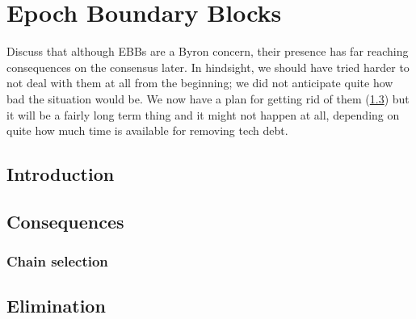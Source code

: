 \chapter{Epoch Boundary Blocks}
\label{ebbs}

Discuss that although EBBs are a Byron concern, their presence has far reaching
consequences on the consensus later. In hindsight, we should have tried harder
to not deal with them at all from the beginning; we did not anticipate quite how
bad the situation would be. We now have a plan for getting rid of them
(\cref{decontamination-plan}) but it will be a fairly long term thing and it
might not happen at all, depending on quite how much time is available for
removing tech debt.


\section{Introduction}

\section{Consequences}

\subsection{Chain selection}
\label{ebb-chain-selection}

\section{Elimination}
\label{decontamination-plan}
